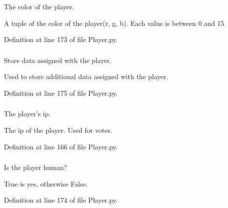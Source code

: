 The color of the player. 

A tuple of the color of the player(r, g, b). Each value is between 0 and 15 

Definition at line 173 of file Player.py.

\hypertarget{class_player_1_1_player_a1a50d6ee0682ff86b83ea314dfa58ce6}{
\subsubsection[{data}]{}}
\label{class_player_1_1_player_a1a50d6ee0682ff86b83ea314dfa58ce6}


Store data assigned with the player. 

Used to store additional data assigned with the player. 

Definition at line 175 of file Player.py.

\hypertarget{class_player_1_1_player_a48ed10bfc12677f9c41e2cae6daafa49}{
\subsubsection[{ip}]{}}
\label{class_player_1_1_player_a48ed10bfc12677f9c41e2cae6daafa49}


The player's ip. 

The ip of the player. Used for votes. 

Definition at line 166 of file Player.py.

\hypertarget{class_player_1_1_player_a01b505c0fe5ff3d20d75327800b1552e}{
\subsubsection[{is\_\-human}]{}}
\label{class_player_1_1_player_a01b505c0fe5ff3d20d75327800b1552e}


Is the player human? 

True is yes, otherwise False. 

Definition at line 174 of file Player.py.

\hypertarget{class_player_1_1_player_a6cea7416f6b4ce563211f3194033f671}{
\subsubsection[{name}]{}}
\label{class_player_1_1_player_a6cea7416f6b4ce563211f3194033f671}


